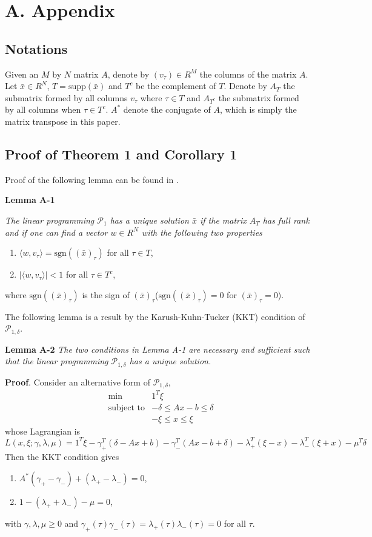 \documentclass{article}
\begin{document}
\newpage

\section*{A. Appendix}
\def\thesection{A}

\subsection{Notations}

Given an $M$ by $N$ matrix $A$, denote by $(v_\tau) \in R^M$ the columns of the matrix $A$. Let $\bar{x} \in R^N$, $T=\mbox{supp}(\bar{x})$ and $T^c$ be the complement of $T$. Denote by $A_T$ the submatrix formed by all columns $v_\tau$ where $\tau\in T$ and $A_{T^c}$ the submatrix formed by all columns when $\tau \in T^c$. $A^*$ denote the conjugate of $A$, which is simply the matrix transpose in this paper.

\subsection{Proof of Theorem 1 and Corollary 1}
Proof of the following lemma can be found in \cite{CanTao05}. 

\textbf{Lemma A-1} {\it The linear programming $\mathcal{P}_1$ has a unique solution $\bar{x}$ if the matrix $A_T$ has full rank and if one can find a vector $w\in R^N$ with the following
two properties
\begin{enumerate}
\item $\langle w, v_\tau\rangle=\mbox{sgn}((\bar{x})_\tau)$ for all $\tau\in T$,
\item $|\langle w, v_\tau\rangle|<1$ for all $\tau\in T^c$,
\end{enumerate}
where $\mbox{sgn}((\bar{x})_\tau)$ is the sign of $(\bar{x})_\tau$($\mbox{sgn}((\bar{x})_\tau)=0$ for $(\bar{x})_\tau=0$).} 

The following lemma is a result by the Karush-Kuhn-Tucker (KKT) condition of $\mathcal{P}_{1,\delta}$.

\textbf{Lemma A-2} {\it The two conditions in Lemma A-1 are necessary and sufficient such that the linear programming $\mathcal{P}_{1,\delta}$ has a unique solution. }

\textbf{Proof}. Consider an alternative form of $\mathcal{P}_{1,\delta}$,
\begin{eqnarray*}
 & \min & 1^T \xi \\
& \mbox{subject to} & -\delta \leq A x - b \leq \delta \\
& & -\xi \leq x \leq \xi 
\end{eqnarray*}
whose Lagrangian is
\[ L(x,\xi; \gamma,\lambda,\mu) = 1^T\xi - \gamma_+^T(\delta -Ax+b) - \gamma_-^T(Ax - b + \delta) - \lambda_+^T(\xi - x) - \lambda_- ^T(\xi + x) - \mu^T \delta \]
Then the KKT condition gives
\begin{enumerate}
 \item $A^*( \gamma_+ - \gamma_- )+ (\lambda_+ - \lambda_- )= 0$, 
 \item $1 - (\lambda_+ + \lambda_-) - \mu = 0$,
\end{enumerate}
with $\gamma, \lambda, \mu \geq 0$ and $\gamma_+(\tau)\gamma_-(\tau)=\lambda_+(\tau)\lambda_-(\tau)=0$ for all $\tau$. 
\end{document}
